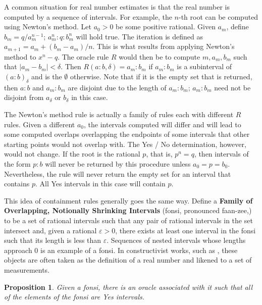 \documentclass[12pt]{article}
\newtheorem{proposition}{Proposition}[section]
\begin{document}
A common situation for real number estimates is that the real number is computed by a sequence of intervals. For example, the $n$-th root can be computed using Newton's method. Let $a_0 >0$ be some positive rational. Given $a_m$, define $b_m = q/a_m^{n-1}$; $a_m^n : q : b_m^n$ will hold true. The iteration is defined as $a_{m+1} = a_m + (b_m - a_m)/n$. This is what results from applying Newton's method to $x^n - q$. The oracle rule $R$ would then be to compute $m, a_m, b_m$ such that $|a_m - b_m| < \delta$.  Then $R(a:b, \delta) = a_m:b_m$ if $a_m:b_m$ is a subinterval of $(a:b)_\delta$ and is the $\emptyset$ otherwise. Note that if it is the empty set that is returned, then $a:b$ and $a_m:b_m$ are disjoint due to the length of $a_m:b_m$; $a_m:b_m$ need not be disjoint from $a_\delta$ or $b_\delta$ in this case. 

The Newton's method rule is actually a family of rules each with different $R$ rules. Given a different $a_0$, the intervals computed will differ and will lead to some computed overlaps overlapping the endpoints of some intervals that other starting points would not overlap with. The Yes / No determination, however, would not  change. If the root is the rational $p$, that is, $p^n = q$,  then intervals of the form $p:b$ will never be returned by this procedure unless $a_0 = p = b_0$. Nevertheless, the rule will never return the empty set for an interval that contains $p$. All Yes intervals in this case will contain $p$. 

This idea of containment rules generally goes the same way. Define a \textbf{Family of Overlapping, Notionally Shrinking Intervals} (fonsi, pronounced faan-zee,)  to be a set of rational intervals such that any pair of rational intervals in the set intersect and, given a rational $\varepsilon >0$, there exists at least one interval in the fonsi such that its length is less than $\varepsilon$. Sequences of nested intervals whose lengths approach 0 is an example of a fonsi. In constructivist works, such as \cite{bridger}, these objects are often taken as the definition of a real number and likened to a set of measurements. 

\begin{proposition}
    Given a fonsi, there is an oracle associated with it such that all of the elements of the fonsi are Yes intervals. 
\end{proposition}
\end{document}
